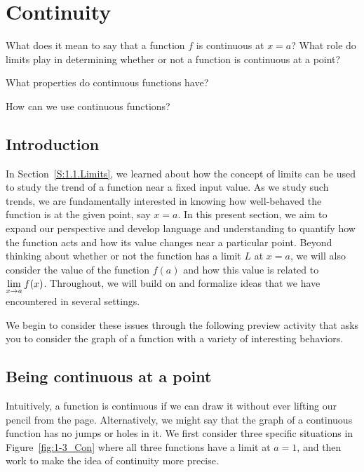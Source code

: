 \section{Continuity} \label{S:1.3.Continuity}

\begin{goals}
\item What does it mean to say that a function $f$ is continuous at $x = a$?  What role do limits play in determining whether or not a function is continuous at a point?
\item What properties do continuous functions have? 
\item How can we use continuous functions?
\end{goals}

\subsection*{Introduction}

In Section~\ref{S:1.1.Limits}, we learned about how the concept of limits can be used to study the trend of a function near a fixed input value.  As we study such trends, we are fundamentally interested in knowing how well-behaved the function is at the given point, say $x = a$.  In this present section, we aim to expand our perspective and develop language and understanding to quantify how the function acts and how its value changes near a particular point.  Beyond thinking about whether or not the function has a limit $L$ at $x = a$, we will also consider the value of the function $f(a)$ and how this value is related to $\displaystyle \lim_{x \to a} f(x)$.  Throughout,  we will build on and formalize ideas that we have encountered in several settings.

We begin to consider these issues through the following preview activity that asks you to consider the graph of a function with a variety of interesting behaviors.


\subsection*{Being continuous at a point} 

Intuitively, a function is continuous if we can draw it without ever lifting our pencil from the page.  Alternatively, we might say that the graph of a continuous function has no jumps or holes in it.  We first consider three specific situations in Figure~\ref{fig:1-3_Con} where all three functions have a limit at $a = 1$, and then work to make the idea of continuity more precise.


